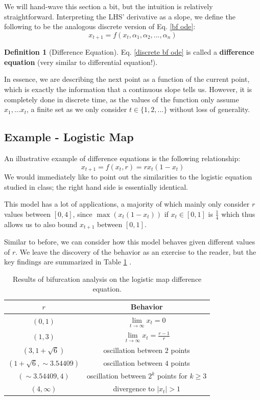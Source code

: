 \documentclass{article}
\theoremstyle{definition}
\newtheorem{definition}{Definition}[section]
\theoremstyle{remark}
\begin{document}
We will hand-wave this section a bit, but the intuition is relatively straightforward. Interpreting the LHS' derivative as a slope, we define the following to be the analogous discrete version of Eq. \ref{bf ode}:
\begin{equation}\label{discrete bf ode}
    x_{t+1} = f(x_t, \alpha_1, \alpha_2, ..., \alpha_n)
\end{equation}
\begin{definition}[Difference Equation]
    Eq. \ref{discrete bf ode} is called a \textbf{difference equation} (very similar to differential equation!). 
\end{definition}
In essence, we are describing the next point as a function of the current point, which is exactly the information that a continuous slope tells us. However, it is completely done in discrete time, as the values of the function only assume $x_1, ... x_t$, a finite set as we only consider $t \in \{ 1, 2, ... \}$ without loss of generality. 
\subsection{Example - Logistic Map}\label{logmap}
An illustrative example of difference equations is the following relationship:
\begin{equation}\label{logisticEQ}
    x_{t+1} = f(x_t, r) = rx_t(1 - x_t)
\end{equation}
We would immediately like to point out the similarities to the logistic equation studied in class; the right hand side is essentially identical. 

This model has a lot of applications, a majority of which mainly only consider $r$ values between $[0, 4]$, since $\max(x_t(1 - x_t))$ if $x_t \in [0, 1]$ is $\frac{1}{4}$ which thus allows us to also bound $x_{t+1}$ between $[0, 1]$. 

Similar to before, we can consider how this model behaves given different values of $r$. We leave the discovery of the behavior as an exercise to the reader, but the key findings are summarized in Table \ref{table:logistictable} \cite{Yamagishi1997}.
\begin{table}[h!]
\centering
    \begin{tabular}{| c | c |} 
     \hline
     $r$ & Behavior \\ [0.5ex] 
     \hline \hline
     $(0, 1)$ &  $ \lim\limits_{t\to\infty} x_t =0$ \\ \hline
     $(1, 3)$ &  $ \lim\limits_{t\to\infty} x_t = \frac{r - 1}{r}$\\\hline
     $(3, 1 + \sqrt{6})$ & oscillation between $2$ points \\\hline
     $(1 + \sqrt{6}, \sim3.54409)$ & oscillation between $4$ points \\\hline
     $(\sim3.54409, 4)$ & oscillation between $2^k$ points for $k \geq 3$ \\ \hline
     $(4, \infty)$ & divergence to $|x_t| > 1$ \\[1ex]
     \hline
    \end{tabular}
    \caption{Results of bifurcation analysis on the logistic map difference equation.}
    \label{table:logistictable}
\end{table}
\end{document}
